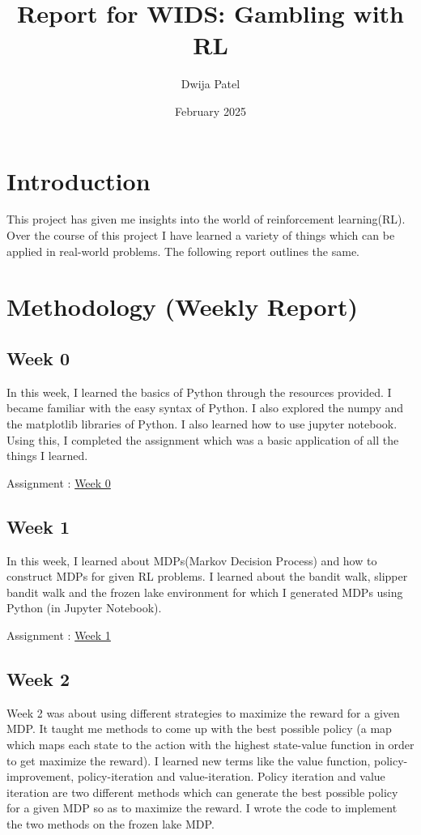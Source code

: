 \documentclass{article}
\title{Report for WIDS: Gambling with RL}
\author{Dwija Patel}
\date{February 2025}
\begin{document}
\maketitle


\section{Introduction}

This project has given me insights into the world of reinforcement learning(RL). Over the course of this project I have learned a variety of things which can be applied in real-world problems.
The following report outlines the same.

\section{Methodology (Weekly Report)}

\subsection{Week 0}

In this week, I learned the basics of Python through the resources provided. I became familiar with the easy syntax of Python. I also explored the numpy and the matplotlib libraries of Python. I also learned how to use jupyter notebook. Using this, I completed the assignment which was a basic application of all the things I learned.

Assignment : \href{https://github.com/dwijaap/WIDS-UID74/blob/main/Assignment0.py}{Week 0}

\subsection{Week 1}

In this week, I learned about MDPs(Markov Decision Process) and how to construct MDPs for given RL problems. I learned about the bandit walk, slipper bandit walk and the frozen lake environment for which I generated MDPs using Python (in Jupyter Notebook).

Assignment : \href{https://github.com/dwijaap/WIDS-UID74/blob/main/Assignment1.ipynb}{Week 1}

\subsection{Week 2}

Week 2 was about using different strategies to maximize the reward for a given MDP. It taught me methods to come up with the best possible policy (a map which maps each state to the action with the highest state-value function in order to get maximize the reward). I learned new terms like the value function, policy-improvement, policy-iteration and value-iteration. Policy iteration and value iteration are two different methods which can generate the best possible policy for a given MDP so as to maximize the reward. I wrote the code to implement the two methods on the frozen lake MDP.
\end{document}
